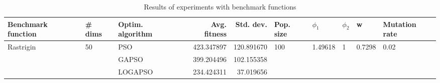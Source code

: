 \begin{table}
\centering
\caption{Results of experiments with benchmark functions}
\begin{tabular}{lllrrlllll}
\toprule
        Benchmark function &             \# dims & Optim. algorithm &  Avg. fitness &  Std. dev. &            Pop. size &               $\phi_{1}$ &         $\phi_{2}$ &                       w &         Mutation rate \\
\midrule
\multirow{3}{*}{Rastrigin} & \multirow{3}{*}{50} &              PSO &    423.347897 & 120.891670 & \multirow{3}{*}{100} & \multirow{3}{*}{1.49618} & \multirow{3}{*}{1} & \multirow{3}{*}{0.7298} & \multirow{3}{*}{0.02} \\
                           &                     &            GAPSO &    399.204496 & 102.155358 &                      &                          &                    &                         &                       \\
                           &                     &          LOGAPSO &    234.424311 &  37.019656 &                      &                          &                    &                         &                       \\
\bottomrule
\end{tabular}
\end{table}
